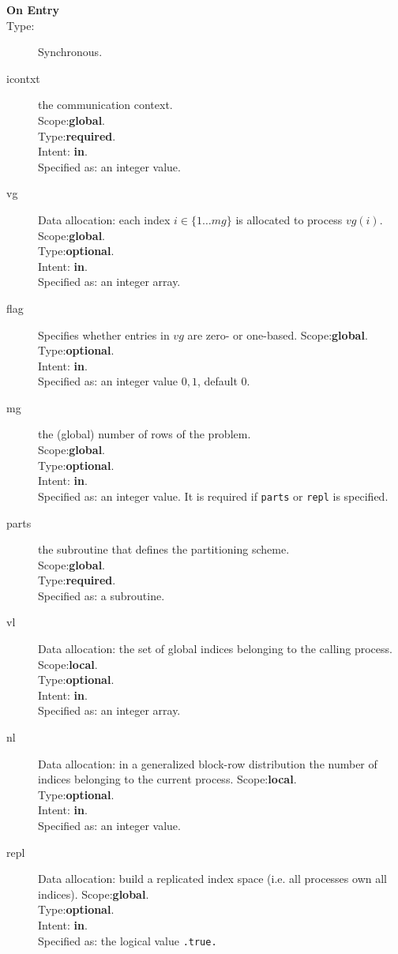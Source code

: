 \begin{description}
\item[\bf  On Entry ]
\item[Type:] Synchronous.
\item[icontxt] the communication context.\\
Scope:{\bf global}.\\
Type:{\bf required}.\\
Intent: {\bf in}.\\
Specified as: an integer value.
\item[vg] Data allocation: each index $i\in \{1\dots mg\}$ is allocated
  to process $vg(i)$.
Scope:{\bf global}.\\
Type:{\bf optional}.\\
Intent: {\bf in}.\\
Specified as: an integer array. 
\item[flag] Specifies whether entries in $vg$ are zero- or one-based.
Scope:{\bf global}.\\
Type:{\bf optional}.\\
Intent: {\bf in}.\\
Specified as: an integer value $0,1$, default $0$.

\item[mg] the (global) number of rows of the problem.\\
Scope:{\bf global}.\\
Type:{\bf optional}.\\
Intent: {\bf in}.\\
Specified as: an integer value. It is required if \verb|parts| or
\verb|repl| is specified. 
\item[parts] the subroutine that defines the partitioning scheme.\\
Scope:{\bf global}.\\
Type:{\bf required}.\\
Specified as: a subroutine. 
\item[vl] Data allocation: the set of global indices belonging to the
  calling process. 
Scope:{\bf local}.\\
Type:{\bf optional}.\\
Intent: {\bf in}.\\
Specified as: an integer array. 
\item[nl] Data allocation: in a generalized block-row distribution the
  number of indices belonging to the current process. 
Scope:{\bf local}.\\
Type:{\bf optional}.\\
Intent: {\bf in}.\\
Specified as: an integer value. 
\item[repl] Data allocation: build a replicated index space (i.e. all
  processes own all indices).
Scope:{\bf global}.\\
Type:{\bf optional}.\\
Intent: {\bf in}.\\
Specified as: the logical value \verb|.true.|
\end{description}

